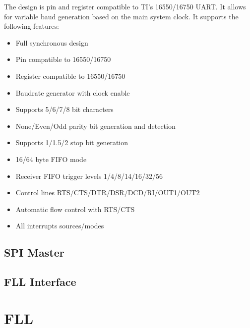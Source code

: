 The design is pin and register compatible to TI's 16550/16750 UART. It allows for variable baud generation based on the main system clock. It supports the following features:

\begin{itemize}
    \item Full synchronous design
    \item Pin compatible to 16550/16750
    \item Register compatible to 16550/16750
    \item Baudrate generator with clock enable
    \item Supports 5/6/7/8 bit characters
    \item None/Even/Odd parity bit generation and detection
    \item Supports 1/1.5/2 stop bit generation
    \item 16/64 byte FIFO mode
    \item Receiver FIFO trigger levels 1/4/8/14/16/32/56
    \item Control lines RTS/CTS/DTR/DSR/DCD/RI/OUT1/OUT2
    \item Automatic flow control with RTS/CTS
    \item All interrupts sources/modes 
\end{itemize}


\subsection{SPI Master}

\subsection{FLL Interface}

\section{FLL}







